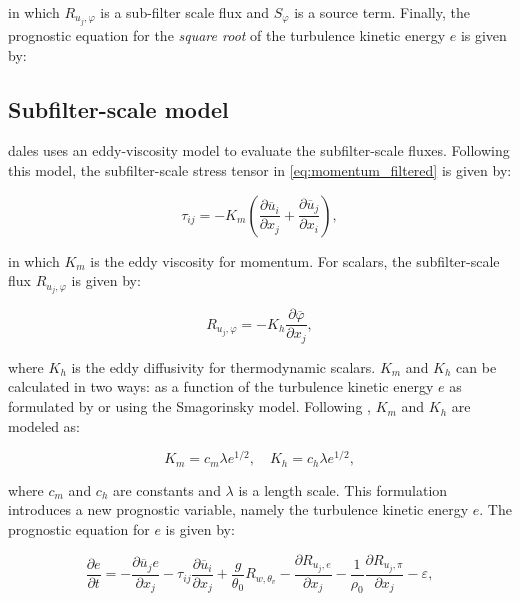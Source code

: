 in which $R_{u_j,\varphi}$ is a sub-filter scale flux and $S_\varphi$ is a source term. Finally, the prognostic equation for the \emph{square root} of the turbulence kinetic energy $e$ is given by:

\subsection{Subfilter-scale model}
\acrshort{dales} uses an eddy-viscosity model to evaluate the subfilter-scale fluxes. Following this model, the subfilter-scale stress tensor in \autoref{eq:momentum_filtered} is given by:

\begin{equation}
    \tau_{ij} = - K_m \left( \frac{\partial \overline{u}_i}{\partial x_j} + \frac{\partial \overline{u}_j}{\partial x_i} \right),
\end{equation}

in which $K_m$ is the eddy viscosity for momentum. For scalars, the subfilter-scale flux $R_{u_j,\varphi}$ is given by:

\begin{equation}
    R_{u_j,\varphi} = - K_h \frac{\partial \overline{\varphi}}{\partial x_j},
\end{equation}

where $K_h$ is the eddy diffusivity for thermodynamic scalars. $K_m$ and $K_h$ can be calculated in two ways: as a function of the turbulence kinetic energy $e$ as formulated by \citet{deardorffStratocumuluscappedMixedLayers1980} or using the Smagorinsky model. Following \citet{deardorffStratocumuluscappedMixedLayers1980}, $K_m$ and $K_h$ are modeled as:

\begin{equation}
    K_m = c_m \lambda e^{1/2}, \quad K_h = c_h \lambda e^{1/2},
\end{equation}

where $c_m$ and $c_h$ are constants and $\lambda$ is a length scale. This formulation introduces a new prognostic variable, namely the turbulence kinetic energy $e$. The prognostic equation for $e$ is given by:

\begin{equation}
    \frac{\partial e}{\partial t} = - \frac{\partial \overline{u}_j e}{\partial x_j} - \tau_{ij} \frac{\partial \overline{u}_i}{\partial x_j} + \frac{g}{\theta_0} R_{w,\theta_v} - \frac{\partial R_{u_j,e}}{\partial x_j} - \frac{1}{\rho_0} \frac{\partial R_{u_j,\pi}}{\partial x_j} - \varepsilon,
    \label{eq:deardorff_tke}
\end{equation}

